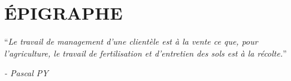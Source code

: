 \chapter*{ÉPIGRAPHE}
    \enquote{\it Le travail de management d’une clientèle est à la vente ce
    que, pour l’agriculture, le travail de fertilisation et
    d’entretien des sols est à la récolte.}
    \begin{flushright}
        \it - Pascal PY
    \end{flushright}
